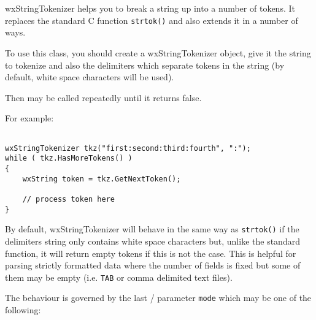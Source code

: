\section{}\label{wxstringtokenizer}

wxStringTokenizer helps you to break a string up into a number of tokens. It
replaces the standard C function {\tt strtok()} and also extends it in a
number of ways.

To use this class, you should create a wxStringTokenizer object, give it the
string to tokenize and also the delimiters which separate tokens in the string
(by default, white space characters will be used).

Then  may be called
repeatedly until it  
returns false.

For example:

\begin{verbatim}

wxStringTokenizer tkz("first:second:third:fourth", ":");
while ( tkz.HasMoreTokens() )
{
    wxString token = tkz.GetNextToken();

    // process token here
}
\end{verbatim}

By default, wxStringTokenizer will behave in the same way as {\tt strtok()} if
the delimiters string only contains white space characters but, unlike the
standard function, it will return empty tokens if this is not the case. This
is helpful for parsing strictly formatted data where the number of fields is
fixed but some of them may be empty (i.e. {\tt TAB} or comma delimited text
files).

The behaviour is governed by the last 
/ 
parameter {\tt mode} which may be one of the following:

\twocolwidtha{5cm}%
\begin{twocollist}\itemsep=0pt
\end{twocollist}

